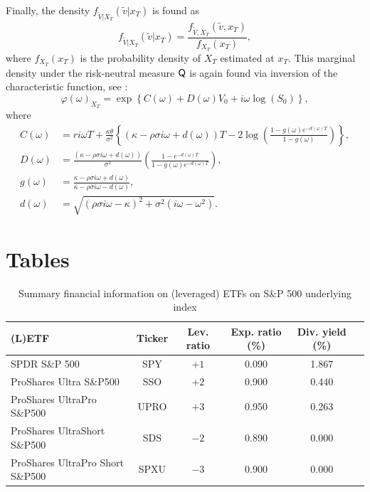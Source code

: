 \documentclass{rQUF2e}
\newcommand{\QQ}{\mathop{\mbox{\sf Q}}}
\theoremstyle{plain}
\theoremstyle{definition}
\begin{document}
	Finally, the density $f_{\widetilde{V}|X_T} (\widetilde{v}|x_T)$ is found as
	\begin{equation*}
	f_{\widetilde{V}|X_T} (\widetilde{v}|x_T) = \frac{f_{\widetilde{V}, X_T} (\widetilde{v}, x_T)}{f_{X_T}(x_T)},
	\end{equation*}
	where $f_{X_T}(x_T)$ is the probability density of $X_T$ estimated at $x_T$. This marginal density under the risk-neutral measure $\QQ$ is again found via inversion of the characteristic function, see \citet{rouah}:
	\begin{equation*}
	\varphi(\omega)_{X_T} = \exp\left\{ C(\omega) + D(\omega)V_0 + i\omega \log(S_0) \right\},
	\end{equation*}
	where
	\begin{align*}
	C(\omega) &= r i \omega T + \frac{\kappa \theta}{\sigma^2} \left\{(\kappa - \rho \sigma i \omega + d(\omega)) T - 2 \log \left(\frac{1-g(\omega) e^{-d(\omega) T}}{1-g(\omega)}\right)\right\},\\
	D(\omega) &= \frac{(\kappa - \rho \sigma i \omega + d(\omega))}{\sigma^2} \left(\frac{1-e^{-d(\omega)T}}{1-g(\omega)e^{-d(\omega)T}}\right), \\
	g(\omega) &= \frac{\kappa - \rho \sigma i \omega + d(\omega)}{\kappa - \rho \sigma i \omega - d(\omega)},\\
	d(\omega) &= \sqrt{(\rho \sigma i \omega - \kappa)^2 + \sigma^2 (i \omega - \omega^2)}.
	\end{align*}
	
	
	
	
	\newpage
	\section{Tables}
	
	\vspace*{\fill}
	\begin{table}[ht!]
		\centering
		\begin{tabular}{lccccc}
			\hline \hline
			(L)ETF & \multicolumn{1}{c}{Ticker} & \multicolumn{1}{c}{Lev. ratio} & \multicolumn{1}{c}{Exp. ratio (\%)} & \multicolumn{1}{c}{Div. yield (\%)} \\ 
			\hline
			SPDR S\&P 500                                & SPY    & $+1$  & 0.090  & 1.867   \\
			ProShares Ultra S\&P500                 & SSO    & $+2$  & 0.900  & 0.440   \\ 
			ProShares UltraPro S\&P500            & UPRO & $+3$  & 0.950  & 0.263   \\ 
			ProShares UltraShort S\&P500         & SDS    & $-2$  & 0.890   & 0.000   \\ 
			ProShares UltraPro Short S\&P500  & SPXU  & $-3$  & 0.900  & 0.000   \\ 
			\hline \hline
		\end{tabular}
		\caption{Summary financial information on (leveraged) ETFs on S\&P 500 underlying index}
		\label{letfs_desc_info}
	\end{table}
	\vspace*{\fill}
	
\end{document}
